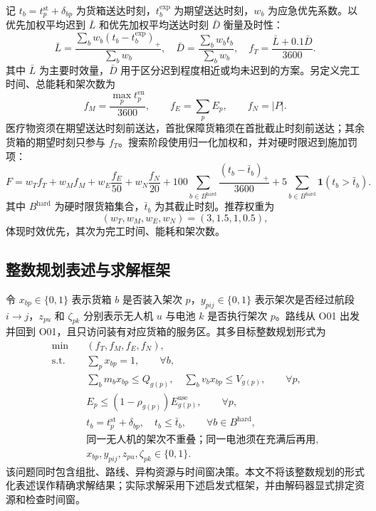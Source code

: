 \documentclass[bwprint,fontset=windows]{gmcmthesis}
\begin{document}
记 $t_b=t_p^{\mathrm{st}}+\delta_{bp}$ 为货箱送达时刻，$t_b^{\mathrm{exp}}$ 为期望送达时刻，$w_b$ 为应急优先系数。以优先加权平均迟到 $\bar L$ 和优先加权平均送达时刻 $\bar D$ 衡量及时性：
\begin{equation}
\bar L=\frac{\sum_b w_b(t_b-t_b^{\mathrm{exp}})_+}{\sum_b w_b},
\quad
\bar D=\frac{\sum_b w_bt_b}{\sum_b w_b},
\quad
f_T=\frac{\bar L+0.1\bar D}{3600}.
\label{eq:q2-timeliness}
\end{equation}
其中 $\bar L$ 为主要时效量，$\bar D$ 用于区分迟到程度相近或均未迟到的方案。另定义完工时间、总能耗和架次数为
\[
f_M=\frac{\max_p t_p^{\mathrm{en}}}{3600},
\qquad
f_E=\sum_pE_p,
\qquad
f_N=|P|.
\]
医疗物资须在期望送达时刻前送达，首批保障货箱须在首批截止时刻前送达；其余货箱的期望时刻只参与 $f_T$。搜索阶段使用归一化加权和，并对硬时限迟到施加罚项：
\begin{equation}
F=w_Tf_T+w_Mf_M+w_E\frac{f_E}{50}+w_N\frac{f_N}{20}
+100\sum_{b\in B^{\mathrm{hard}}}\frac{(t_b-\bar t_b)_+}{3600}
+5\sum_{b\in B^{\mathrm{hard}}}\mathbf{1}(t_b>\bar t_b).
\label{eq:q2-scalar-objective}
\end{equation}
其中 $B^{\mathrm{hard}}$ 为硬时限货箱集合，$\bar t_b$ 为其截止时刻。推荐权重为
\[
(w_T,w_M,w_E,w_N)=(3,1.5,1,0.5),
\]
体现时效优先，其次为完工时间、能耗和架次数。

\subsection{整数规划表述与求解框架}

令 $x_{bp}\in\{0,1\}$ 表示货箱 $b$ 是否装入架次 $p$，$y_{pij}\in\{0,1\}$ 表示架次是否经过航段 $i\to j$，$z_{pu}$ 和 $\zeta_{pk}$ 分别表示无人机 $u$ 与电池 $k$ 是否执行架次 $p$。路线从 O01 出发并回到 O01，且只访问装有对应货箱的服务区。其多目标整数规划形式为
\begin{equation}
\begin{aligned}
\min\quad &(f_T,f_M,f_E,f_N),\\
\text{s.t.}\quad
&\sum_p x_{bp}=1,\qquad \forall b,\\
&\sum_b m_bx_{bp}\le Q_{g(p)},\quad
  \sum_b v_bx_{bp}\le V_{g(p)},\qquad \forall p,\\
&E_p\le(1-\rho_{g(p)})E_{g(p)}^{\mathrm{use}},\qquad \forall p,\\
&t_b=t_p^{\mathrm{st}}+\delta_{bp},\quad
  t_b\le \bar t_b,\qquad \forall b\in B^{\mathrm{hard}},\\
&\text{同一无人机的架次不重叠；同一电池须在充满后再用},\\
&x_{bp},y_{pij},z_{pu},\zeta_{pk}\in\{0,1\}.
\end{aligned}
\label{eq:q2-integer-model}
\end{equation}
该问题同时包含组批、路线、异构资源与时间窗决策。本文不将该整数规划的形式化表述误作精确求解结果；实际求解采用下述启发式框架，并由解码器显式排定资源和检查时间窗。
\end{document}
